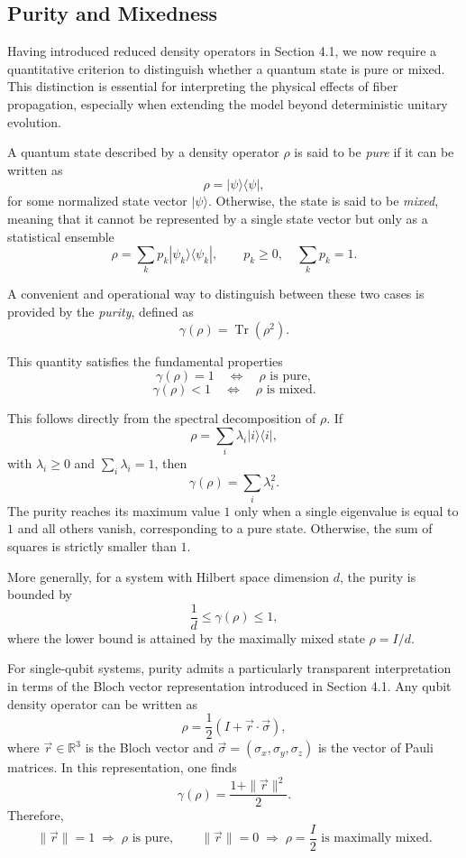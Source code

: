 \documentclass[a4paper]{article}
\begin{document}
\subsection{Purity and Mixedness}

Having introduced reduced density operators in Section 4.1, we now require a quantitative criterion to distinguish whether a quantum state is pure or mixed. This distinction is essential for interpreting the physical effects of fiber propagation, especially when extending the model beyond deterministic unitary evolution.

A quantum state described by a density operator $\rho$ is said to be \emph{pure} if it can be written as
\[
\rho = |\psi\rangle \langle \psi|,
\]
for some normalized state vector $|\psi\rangle$. Otherwise, the state is said to be \emph{mixed}, meaning that it cannot be represented by a single state vector but only as a statistical ensemble
\[
\rho = \sum_k p_k |\psi_k\rangle \langle \psi_k|, \qquad p_k \ge 0, \quad \sum_k p_k = 1.
\]

A convenient and operational way to distinguish between these two cases is provided by the \emph{purity}, defined as
\[
\gamma(\rho) = \operatorname{Tr}(\rho^2).
\]

This quantity satisfies the fundamental properties
\[
\gamma(\rho) = 1 \quad \Longleftrightarrow \quad \rho \text{ is pure},
\]
\[
\gamma(\rho) < 1 \quad \Longleftrightarrow \quad \rho \text{ is mixed}.
\]

This follows directly from the spectral decomposition of $\rho$. If
\[
\rho = \sum_i \lambda_i |i\rangle \langle i|,
\]
with $\lambda_i \ge 0$ and $\sum_i \lambda_i = 1$, then
\[
\gamma(\rho) = \sum_i \lambda_i^2.
\]
The purity reaches its maximum value $1$ only when a single eigenvalue is equal to $1$ and all others vanish, corresponding to a pure state. Otherwise, the sum of squares is strictly smaller than $1$.

More generally, for a system with Hilbert space dimension $d$, the purity is bounded by
\[
\frac{1}{d} \le \gamma(\rho) \le 1,
\]
where the lower bound is attained by the maximally mixed state $\rho = I/d$.

\medskip

For single-qubit systems, purity admits a particularly transparent interpretation in terms of the Bloch vector representation introduced in Section 4.1. Any qubit density operator can be written as
\[
\rho = \frac{1}{2}\left(I + \vec{r} \cdot \vec{\sigma}\right),
\]
where $\vec{r} \in \mathbb{R}^3$ is the Bloch vector and $\vec{\sigma} = (\sigma_x, \sigma_y, \sigma_z)$ is the vector of Pauli matrices. In this representation, one finds
\[
\gamma(\rho) = \frac{1 + \|\vec{r}\|^2}{2}.
\]
Therefore,
\[
\|\vec{r}\| = 1 \;\Rightarrow\; \rho \text{ is pure},
\qquad
\|\vec{r}\| = 0 \;\Rightarrow\; \rho = \frac{I}{2} \text{ is maximally mixed}.
\]
\end{document}
